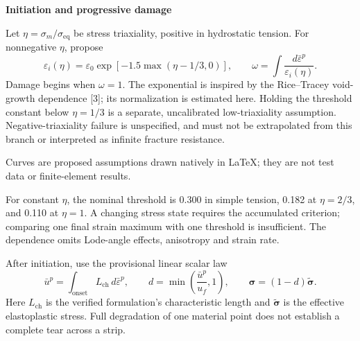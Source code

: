 \documentclass[10pt,a4paper]{article}
\newcommand{\PageTitle}[1]{{\LARGE\bfseries\color{Navy}#1\par}\vspace{7pt}}
\begin{document}
\clearpage
\PageTitle{Initiation and progressive damage}
Let $\eta=\sigma_m/\sigma_{\mathrm{eq}}$ be stress triaxiality, positive in hydrostatic tension. For nonnegative $\eta$, propose
\[
\varepsilon_i(\eta)=\varepsilon_0
       \exp[-1.5\max(\eta-1/3,0)],
\qquad
\omega=\int\frac{d\bar\varepsilon^p}{\varepsilon_i(\eta)}.
\]
Damage begins when $\omega=1$. The exponential is inspired by the Rice--Tracey void-growth dependence [3]; its normalization is estimated here. Holding the threshold constant below $\eta=1/3$ is a separate, uncalibrated low-triaxiality assumption. Negative-triaxiality failure is unspecified, and must not be extrapolated from this branch or interpreted as infinite fracture resistance.

\begin{center}
\end{center}
{\small Curves are proposed assumptions drawn natively in \LaTeX; they are not test data or finite-element results.}

For constant $\eta$, the nominal threshold is 0.300 in simple tension, 0.182 at $\eta=2/3$, and 0.110 at $\eta=1$. A changing stress state requires the accumulated criterion; comparing one final strain maximum with one threshold is insufficient. The dependence omits Lode-angle effects, anisotropy and strain rate.

After initiation, use the provisional linear scalar law
\[
\bar u^p=\int_{\mathrm{onset}} L_{\mathrm{ch}}\,d\bar\varepsilon^p,\qquad
d=\min\!\left(\frac{\bar u^p}{u_f},1\right),\qquad
\boldsymbol\sigma=(1-d)\widetilde{\boldsymbol\sigma}.
\]
Here $L_{\mathrm{ch}}$ is the verified formulation's characteristic length and $\widetilde{\boldsymbol\sigma}$ is the effective elastoplastic stress. Full degradation of one material point does not establish a complete tear across a strip.
\end{document}
